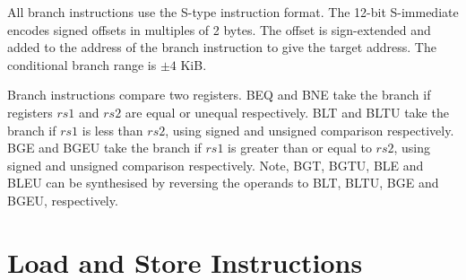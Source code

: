 \documentclass{article}
\begin{document}
All branch instructions use the S-type instruction format. The 12-bit S-immediate encodes signed offsets in multiples of 2 bytes. The offset is sign-extended and added to the address of the branch instruction to give the target address. The conditional branch range is $\pm4$ KiB.

Branch instructions compare two registers. BEQ and BNE take the branch if registers $rs1$ and $rs2$ are equal or unequal respectively. BLT and BLTU take the branch if $rs1$ is less than $rs2$, using signed and unsigned comparison respectively. BGE and BGEU take the branch if $rs1$ is greater than or equal to $rs2$, using signed and unsigned comparison respectively. Note, BGT, BGTU, BLE and BLEU can be synthesised by reversing the operands to BLT, BLTU, BGE and BGEU, respectively.

\section{Load and Store Instructions}
\end{document}
